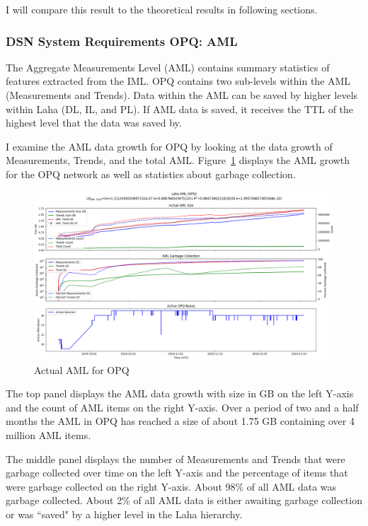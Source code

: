I will compare this result to the theoretical results in following sections.

\subsubsection{DSN System Requirements OPQ: AML}

The Aggregate Measurements Level (AML) contains summary statistics of features extracted from the IML. OPQ contains two sub-levels within the AML (Measurements and Trends). Data within the AML can be saved by higher levels within Laha (DL, IL, and PL). If AML data is saved, it receives the TTL of the highest level that the data was saved by.

I examine the AML data growth for OPQ by looking at the data growth of Measurements, Trends, and the total AML. Figure~\ref{fig:actual_aml_opq} displays the AML growth for the OPQ network as well as statistics about garbage collection.

\begin{figure}[H]
    \centering
    \includegraphics[width=\linewidth]{figures/actual_aml_opq.png}
    \caption{Actual AML for OPQ}
    \label{fig:actual_aml_opq}
\end{figure}

The top panel displays the AML data growth with size in GB on the left Y-axis and the count of AML items on the right Y-axis. Over a period of two and a half months the AML in OPQ has reached a size of about 1.75 GB containing over 4 million AML items.

The middle panel displays the number of Measurements and Trends that were garbage collected over time on the left Y-axis and the percentage of items that were garbage collected on the right Y-axis. About 98\% of all AML data was garbage collected. About 2\% of all AML data is either awaiting garbage collection or was ``saved" by a higher level in the Laha hierarchy.

